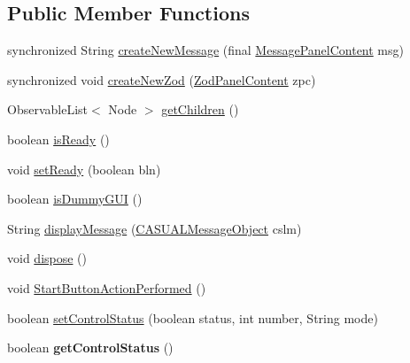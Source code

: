 \subsection*{Public Member Functions}
\begin{DoxyCompactItemize}
\item 
synchronized String \hyperlink{classcom_1_1casual__dev_1_1zodui_1_1_c_a_s_u_a_l_zod_main_u_i_a8d083701ecbb8960a3b5d4b1061e1352}{create\-New\-Message} (final \hyperlink{classcom_1_1casual__dev_1_1zodui_1_1messagepanel_1_1_message_panel_content}{Message\-Panel\-Content} msg)
\item 
synchronized void \hyperlink{classcom_1_1casual__dev_1_1zodui_1_1_c_a_s_u_a_l_zod_main_u_i_a290830594c22f97efd15a062f7f2d45d}{create\-New\-Zod} (\hyperlink{classcom_1_1casual__dev_1_1zodui_1_1contentpanel_1_1_zod_panel_content}{Zod\-Panel\-Content} zpc)
\item 
Observable\-List$<$ Node $>$ \hyperlink{classcom_1_1casual__dev_1_1zodui_1_1_c_a_s_u_a_l_zod_main_u_i_a6dc1a7f2dc2e0a476cd33696e3735807}{get\-Children} ()
\item 
boolean \hyperlink{classcom_1_1casual__dev_1_1zodui_1_1_c_a_s_u_a_l_zod_main_u_i_ab49c73b591b0c99782b29c1a2bc2ce3b}{is\-Ready} ()
\item 
void \hyperlink{classcom_1_1casual__dev_1_1zodui_1_1_c_a_s_u_a_l_zod_main_u_i_a323042258706ea613f31b2896009e4d9}{set\-Ready} (boolean bln)
\item 
boolean \hyperlink{classcom_1_1casual__dev_1_1zodui_1_1_c_a_s_u_a_l_zod_main_u_i_a48e56d085bff3796e73a83ff042d1e86}{is\-Dummy\-G\-U\-I} ()
\item 
String \hyperlink{classcom_1_1casual__dev_1_1zodui_1_1_c_a_s_u_a_l_zod_main_u_i_aba37e23a3ffb7e5604d4cd474f512a1d}{display\-Message} (\hyperlink{class_c_a_s_u_a_l_1_1_c_a_s_u_a_l_message_object}{C\-A\-S\-U\-A\-L\-Message\-Object} cslm)
\item 
void \hyperlink{classcom_1_1casual__dev_1_1zodui_1_1_c_a_s_u_a_l_zod_main_u_i_a5231cb6d96d31725212c557c561e979e}{dispose} ()
\item 
void \hyperlink{classcom_1_1casual__dev_1_1zodui_1_1_c_a_s_u_a_l_zod_main_u_i_a752aedd8ee6097b39b70a82f54e3d488}{Start\-Button\-Action\-Performed} ()
\item 
boolean \hyperlink{classcom_1_1casual__dev_1_1zodui_1_1_c_a_s_u_a_l_zod_main_u_i_a1c7799e935d98bcd646f650091986df9}{set\-Control\-Status} (boolean status, int number, String mode)
\item 
\hypertarget{classcom_1_1casual__dev_1_1zodui_1_1_c_a_s_u_a_l_zod_main_u_i_a5a06ecf390a893a7d03e2dacafc486e6}{boolean {\bfseries get\-Control\-Status} ()}\label{classcom_1_1casual__dev_1_1zodui_1_1_c_a_s_u_a_l_zod_main_u_i_a5a06ecf390a893a7d03e2dacafc486e6}


\end{DoxyCompactItemize}
